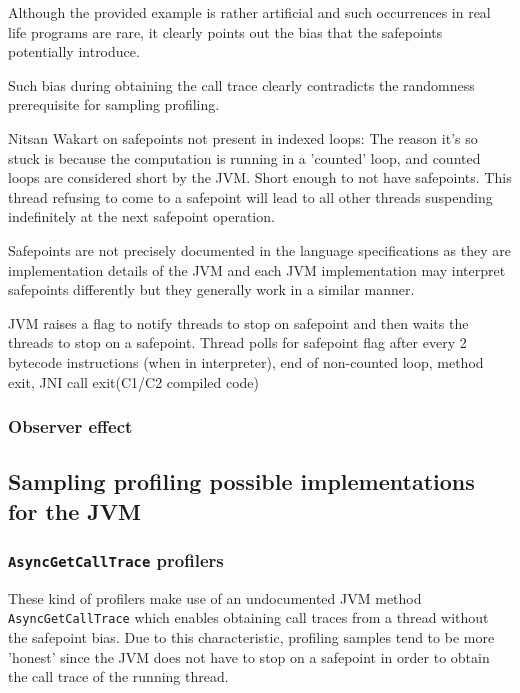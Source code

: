 \documentclass[..thesis.tex]{subfiles}
\begin{document}
Although the provided example is rather artificial and such occurrences in real life programs are rare, it clearly points out the bias that the safepoints potentially introduce.



Such bias during obtaining the call trace clearly contradicts the randomness prerequisite for sampling profiling.




Nitsan Wakart on safepoints not present in indexed loops: The reason it's so stuck is because the computation is running in a 'counted' loop, and counted loops are considered short by the JVM. Short enough to not have safepoints. This thread refusing to come to a safepoint will lead to all other threads suspending indefinitely at the next safepoint operation.


Safepoints are not precisely documented in the language specifications as they are implementation details of the JVM and each JVM implementation may interpret safepoints differently but they generally work in a similar manner.

JVM raises a flag to notify threads to stop on safepoint and then waits the threads to stop on a safepoint. Thread polls for safepoint flag after every 2 bytecode instructions (when in interpreter), end of non-counted loop, method exit, JNI call exit(C1/C2 compiled code)

\subsubsection{Observer effect}

\subsection{Sampling profiling possible implementations for the JVM}



\subsubsection{\texttt{AsyncGetCallTrace} profilers}
These kind of profilers make use of an undocumented JVM method \texttt{Async\-Get\-Call\-Trace} \cite{agct_source} which enables obtaining call traces from a thread without the safepoint bias. Due to this characteristic, profiling samples tend to be more 'honest' since the JVM does not have to stop on a safepoint in order to obtain the call trace of the running thread.
\end{document}
